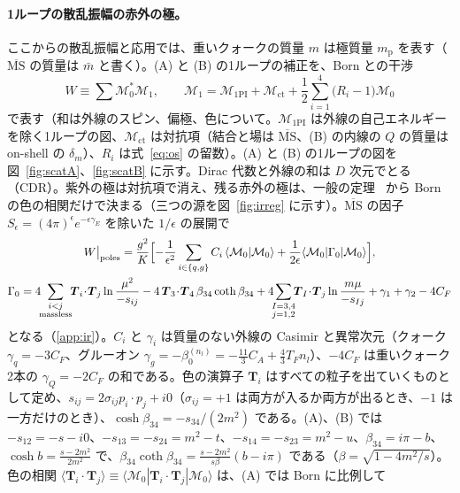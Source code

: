\documentclass[a4paper,10pt]{ltjsarticle}
\newcommand{\MSbar}{\overline{\mathrm{MS}}}
\begin{document}
\paragraph{1ループの散乱振幅の赤外の極。}ここからの散乱振幅と応用では、重いクォークの質量 $m$ は極質量 $m_{\mathrm p}$ を表す（$\MSbar$ の質量は $\bar m$ と書く）。(A) と (B) の1ループの補正を、Born との干渉
\begin{equation*}
W\equiv\sum\mathcal M_0^*\mathcal M_1,\qquad
\mathcal M_1=\mathcal M_{\mathrm{1PI}}+\mathcal M_{\mathrm{ct}}+\frac12\sum_{i=1}^4\bigl(R_i-1\bigr)\mathcal M_0
\end{equation*}
で表す（和は外線のスピン、偏極、色について。$\mathcal M_{\mathrm{1PI}}$ は外線の自己エネルギーを除く1ループの図、$\mathcal M_{\mathrm{ct}}$ は対抗項（結合と場は $\MSbar$、(B) の内線の $Q$ の質量は on-shell の $\delta_m$）、$R_i$ は式~\eqref{eq:os} の留数）。(A) と (B) の1ループの図を図~\ref{fig:scatA}、\ref{fig:scatB} に示す。Dirac 代数と外線の和は $D$ 次元でとる（CDR）。紫外の極は対抗項で消え、残る赤外の極は、一般の定理~\cite{catani98,bn09,bn09m} から Born の色の相関だけで決まる（三つの源を図~\ref{fig:irreg} に示す）。$\overline{\mathrm{MS}}$ の因子 $S_\epsilon=(4\pi)^\epsilon e^{-\epsilon\gamma_E}$ を除いた $1/\epsilon$ の展開で
\begin{equation}
\begin{gathered}
W\big|_{\mathrm{poles}}=\frac{g^2}{K}\Bigl[-\frac{1}{\epsilon^2}\sum_{i\in\{q,g\}}C_i\,\langle\mathcal M_0|\mathcal M_0\rangle+\frac{1}{2\epsilon}\langle\mathcal M_0|\Gamma_0|\mathcal M_0\rangle\Bigr],\\
\Gamma_0=4\!\!\sum_{\substack{i<j\\ \text{massless}}}\!\!\boldsymbol T_i\!\cdot\!\boldsymbol T_j\ln\frac{\mu^2}{-s_{ij}}
-4\,\boldsymbol T_3\!\cdot\!\boldsymbol T_4\,\beta_{34}\coth\beta_{34}
+4\!\!\sum_{\substack{I=3,4\\ j=1,2}}\!\!\boldsymbol T_I\!\cdot\!\boldsymbol T_j\ln\frac{m\mu}{-s_{Ij}}
+\gamma_1+\gamma_2-4C_F
\end{gathered}
\label{eq:irpole}
\end{equation}
となる（\ref{app:ir}）。$C_i$ と $\gamma_i$ は質量のない外線の Casimir と異常次元（クォーク $\gamma_q=-3C_F$、グルーオン $\gamma_g=-\beta_0^{(n_l)}=-\frac{11}3C_A+\frac43T_Fn_l$）、$-4C_F$ は重いクォーク2本の $\gamma_Q=-2C_F$ の和である。色の演算子 $\boldsymbol T_i$ はすべての粒子を出ていくものとして定め、$s_{ij}=2\sigma_{ij}p_i\cdot p_j+i0$（$\sigma_{ij}=+1$ は両方が入るか両方が出るとき、$-1$ は一方だけのとき）、$\cosh\beta_{34}=-s_{34}/(2m^2)$ である。(A)、(B) では $-s_{12}=-s-i0$、$-s_{13}=-s_{24}=m^2-t$、$-s_{14}=-s_{23}=m^2-u$、$\beta_{34}=i\pi-b$、$\cosh b=\frac{s-2m^2}{2m^2}$ で、$\beta_{34}\coth\beta_{34}=\frac{s-2m^2}{s\beta}(b-i\pi)$ である（$\beta=\sqrt{1-4m^2/s}$）。色の相関 $\langle\boldsymbol T_i\!\cdot\!\boldsymbol T_j\rangle\equiv\langle\mathcal M_0|\boldsymbol T_i\!\cdot\!\boldsymbol T_j|\mathcal M_0\rangle$ は、(A) では Born に比例して
\end{document}
